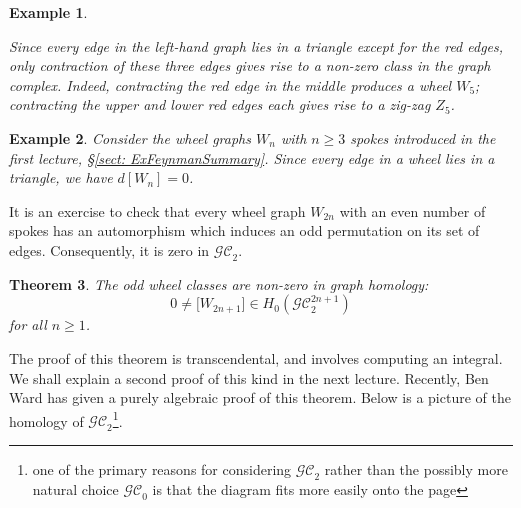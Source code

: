 \documentclass[12pt]{amsart}
\theoremstyle{plain}
\newtheorem{thm}{Theorem}
\newtheorem{ex}[thm]{Example}
\newcommand{\GC}{\mathcal{GC}}
\newcommand{\0}{\color{blue}{\mathsf{0}}}
\begin{document}
\begin{ex}
\begin{figure}[h]
\end{figure}

\noindent 
Since every edge in the left-hand graph lies in a triangle except for the red edges, only contraction of these  three edges gives rise to a non-zero class in the graph complex. Indeed, contracting the red edge in the middle produces a wheel $W_5$; contracting the upper and lower red edges each  gives rise to  a zig-zag $Z_5$. 

\end{ex}
\begin{ex}Consider the  wheel graphs $W_n$ with $n\geq 3$ spokes introduced in the first lecture, \S\ref{sect: ExFeynmanSummary}. Since every edge in a wheel lies in a triangle, we have $d[W_n]=0$. 
\end{ex}

It is an exercise to check that every  wheel graph  $W_{2n}$ with an even number of spokes has an automorphism which induces an odd permutation on its set of edges. 
Consequently, it is  zero in $\GC_2$. 

\begin{thm} \cite{RossiWillwacher} The odd wheel classes are non-zero in graph homology:
\[   0\neq {[} W_{2n+1} ]   \in    H_{0}(\GC^{2n+1}_2) \]
for all $n\geq 1$.
\end{thm}
The proof of this theorem is transcendental, and involves computing an integral. We shall explain a second proof of this kind in the next lecture. 
Recently, Ben Ward \cite{Ward} has given  a purely algebraic proof of this theorem. Below is a picture of the homology of $\GC_2$\footnote{one of the primary reasons for considering $\GC_2$ rather than the possibly more natural choice $\GC_0$ is that the diagram fits more easily onto  the page}.
\end{document}
